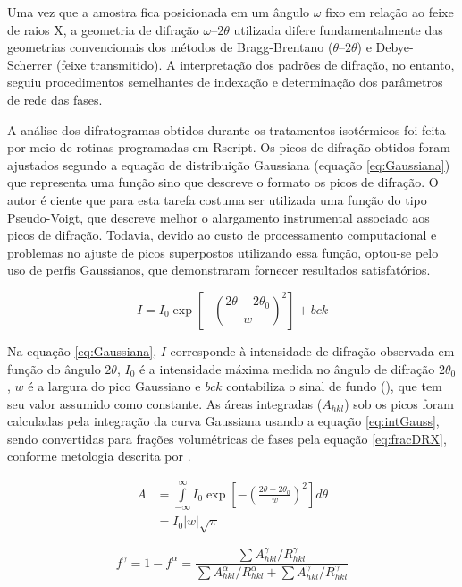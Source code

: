 Uma vez que a amostra fica posicionada em um ângulo $\omega$ fixo em relação ao feixe de raios X, a geometria de difração $\omega$--$2\theta$ utilizada difere fundamentalmente das geometrias convencionais dos métodos de Bragg-Brentano ($\theta$--$2\theta$) e Debye-Scherrer (feixe transmitido). A interpretação dos padrões de difração, no entanto, seguiu procedimentos semelhantes de indexação e determinação dos parâmetros de rede das fases.

A análise dos difratogramas obtidos durante os tratamentos isotérmicos foi feita por meio de rotinas programadas em Rscript. Os picos de difração obtidos foram ajustados segundo a equação de distribuição Gaussiana (equação \ref{eq:Gaussiana}) que representa uma função sino que descreve o formato os picos de difração. O autor é ciente que para esta tarefa costuma ser utilizada uma função do tipo Pseudo-Voigt, que descreve melhor o alargamento instrumental associado aos picos de difração. Todavia, devido ao custo de processamento computacional e problemas no ajuste de picos superpostos utilizando essa função, optou-se pelo uso de perfis Gaussianos, que demonstraram fornecer resultados satisfatórios.

\begin{equation}
	I = I_0 \exp{\left[-\left(\frac{2\theta - 2\theta_0}{w}\right)^2\right]} + bck
	\label{eq:Gaussiana}
\end{equation}

Na equação \ref{eq:Gaussiana}, $I$ corresponde à intensidade de difração observada em função do ângulo $2\theta$, $I_0$ é a intensidade máxima medida no ângulo de difração $2\theta_0$, $w$ é a largura do pico Gaussiano e $bck$ contabiliza o sinal de fundo (), que tem seu valor assumido como constante. As áreas integradas ($A_{hkl}$) sob os picos foram calculadas pela integração da curva Gaussiana usando a equação \ref{eq:intGauss}, sendo convertidas para frações volumétricas de fases pela equação \ref{eq:fracDRX}, conforme metologia descrita por .

\begin{align}
	A &= \int\limits_{-\infty}^{\infty} I_0 \exp{\left[-\left(\frac{2\theta - 2\theta_0}{w}\right)^2\right]} d \theta \nonumber \\
	&= I_0 |w| \sqrt{\pi}
	\label{eq:intGauss}
\end{align}

\begin{equation}
	f^\gamma = 1 - f^\alpha = \frac{\sum A_{hkl}^\gamma/R_{hkl}^\gamma}{\sum A_{hkl}^\alpha/R_{hkl}^\alpha + \sum A_{hkl}^\gamma/R_{hkl}^\gamma}
	\label{eq:fracDRX}
\end{equation}

